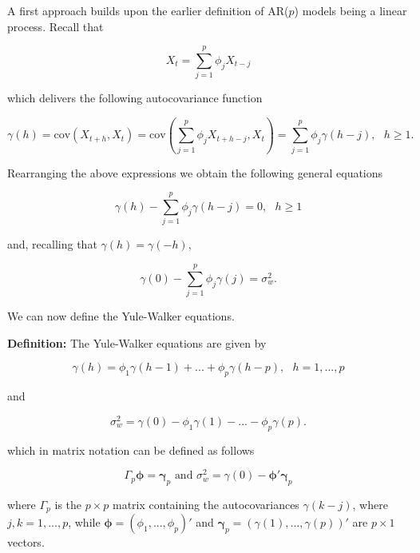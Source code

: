 \documentclass[]{book}
\theoremstyle{definition}
\theoremstyle{definition}
\theoremstyle{definition}
\theoremstyle{remark}
\begin{document}
A first approach builds upon the earlier definition of AR(\(p\)) models
being a linear process. Recall that

\begin{equation}
    X_t = \sum_{j = 1}^{p} \phi_j X_{t-j}
\end{equation}

which delivers the following autocovariance function

\begin{equation}
    \gamma(h) = \text{cov}(X_{t+h}, X_t) = \text{cov}\left(\sum_{j = 1}^{p} \phi_j X_{t+h-j}, X_t\right) = \sum_{j = 1}^{p} \phi_j \gamma(h-j), \mbox{ } h \geq 1.
\end{equation}

Rearranging the above expressions we obtain the following general
equations

\begin{equation}
    \gamma(h) - \sum_{j = 1}^{p} \phi_j \gamma(h-j) = 0, \mbox{ } h \geq 1
\end{equation}

and, recalling that \(\gamma(h) = \gamma(-h)\),

\begin{equation}
    \gamma(0) - \sum_{j = 1}^{p} \phi_j \gamma(j) = \sigma_w^2.
\end{equation}

We can now define the Yule-Walker equations.

\textbf{Definition:} The Yule-Walker equations are given by

\begin{equation}
    \gamma(h) = \phi_1 \gamma(h-1) + ... + \phi_p \gamma(h-p), \mbox{ } h = 1,...,p
\end{equation}

and

\begin{equation}
    \sigma_w^2 = \gamma(0) - \phi_1 \gamma(1) - ... - \phi_p \gamma(p).
\end{equation}

which in matrix notation can be defined as follows

\begin{equation}
    \Gamma_p \mathbf{\phi} = \mathbf{\gamma}_p \,\, \text{and} \,\, \sigma_w^2 = \gamma(0) - \mathbf{\phi}'\mathbf{\gamma}_p
\end{equation}

where \(\Gamma_p\) is the \(p\times p\) matrix containing the
autocovariances \(\gamma(k-j)\), where \(j,k = 1, ...,p\), while
\(\mathbf{\phi} = (\phi_1,...,\phi_p)'\) and
\(\mathbf{\gamma}_p = (\gamma(1),...,\gamma(p))'\) are \(p\times 1\)
vectors.
\end{document}
